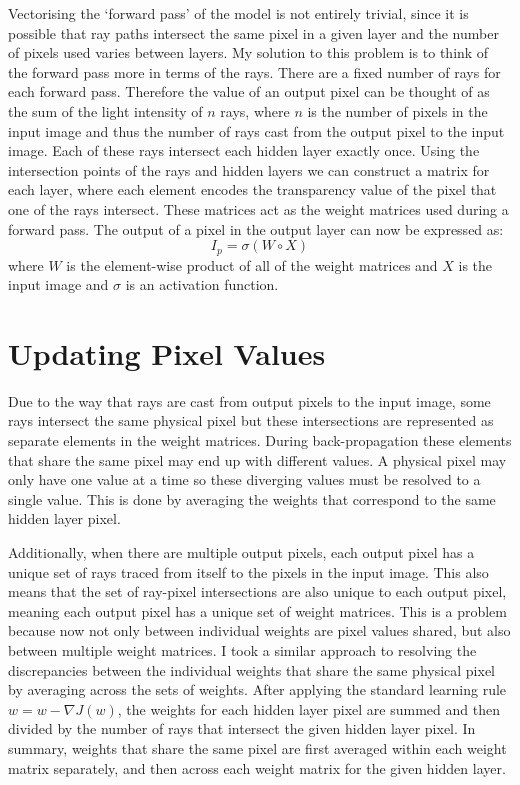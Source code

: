 \documentclass[]{article}
\begin{document}
Vectorising the ‘forward pass’ of the model is not entirely trivial, since it is possible that ray paths intersect the same pixel in a given layer and the number of pixels used varies between layers. 
My solution to this problem is to think of the forward pass more in terms of the rays. There are a fixed number of rays for each forward pass. Therefore the value of an output pixel can be thought of as the sum of the light intensity of $n$ rays, where $n$ is the number of pixels in the input image and thus the number of rays cast from the output pixel to the input image. Each of these rays intersect each hidden layer exactly once. Using the intersection points of the rays and hidden layers we can construct a matrix for each layer, where each element encodes the transparency value of the pixel that one of the rays intersect. These matrices act as the weight matrices used during a forward pass. The output of a pixel in the output layer can now be expressed as: 
$$I_p=\sigma(W\circ X)$$
where $W$ is the element-wise product of all of the weight matrices and $X$ is the input image and $\sigma$ is an activation function.

\section{Updating Pixel Values}
Due to the way that rays are cast from output pixels to the input image, some rays intersect the same physical pixel but these intersections are represented as separate elements in the weight matrices. During back-propagation these elements that share the same pixel may end up with different values. A physical pixel may only have one value at a time so these diverging values must be resolved to a single value. This is done by averaging the weights that correspond to the same hidden layer pixel.

Additionally, when there are multiple output pixels, each output pixel has a unique set of rays traced from itself to the pixels in the input image. This also means that the set of ray-pixel intersections are also unique to each output pixel, meaning each output pixel has a unique set of weight matrices. This is a problem because now not only between individual weights are pixel values shared, but also between multiple weight matrices. I took a similar approach to resolving the discrepancies between the individual weights that share the same physical pixel by averaging across the sets of weights. After applying the standard learning rule $w=w-\nabla J(w)$, the weights for each hidden layer pixel are summed and then divided by the number of rays that intersect the given hidden layer pixel. In summary, weights that share the same pixel are first averaged within each weight matrix separately, and then across each weight matrix for the given hidden layer.
\end{document}
